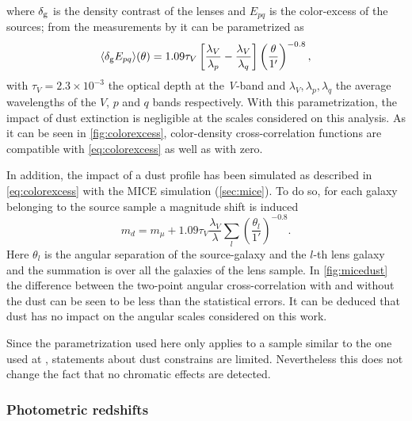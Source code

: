 where $\delta_{\rm g}$ is the density contrast of the lenses and $E_{pq}$ is the color-excess of the sources; from the measurements by \cite{2010MNRAS.405.1025M} it can be parametrized as
\begin{equation}
\langle\delta_{\rm g}E_{pq}\rangle(\theta) = 1.09\tau_V\left[\frac{\lambda_V}{\lambda_p}-\frac{\lambda_V}{\lambda_q}\right]\left(\frac{\theta}{1'}\right)^{-0.8},
\label{eq:colorexcess}
\end{equation}
with $\tau_V=2.3\times10^{-3}$ the optical depth at the {\it V}-band  and $\lambda_V,\lambda_p,\lambda_q$ the average wavelengths of the $V$, $p$ and $q$ bands respectively. With this parametrization, the impact of dust extinction is negligible at the scales considered on this analysis. As it can be seen in \autoref{fig:colorexcess}, color-density cross-correlation functions are compatible with \autoref{eq:colorexcess} as well as with zero.
\newline

In addition, the impact of a dust profile has been simulated as described in \autoref{eq:colorexcess} with the MICE simulation (\autoref{sec:mice}). To do so, for each galaxy belonging to the source sample a magnitude shift is induced
\begin{equation}
m_d = m_\mu +1.09\tau_V\frac{\lambda_V}{\lambda}\sum\limits_{l}\left(\frac{\theta_l}{1'}\right)^{-0.8}.
\end{equation}
Here $\theta_l$ is the angular separation of the source-galaxy and the $l$-th lens galaxy and the summation is over all the galaxies of the lens sample. In \autoref{fig:micedust} the difference between the two-point angular cross-correlation with and without the dust can be seen to be less than the statistical errors. It can be deduced that dust has no impact on the angular scales considered on this work.
\newline

Since the parametrization used here only applies to a sample similar to the one used at \cite{2010MNRAS.405.1025M}, statements about dust constrains are limited. Nevertheless this does not change the fact that no chromatic effects are detected.

\subsubsection{Photometric redshifts}

